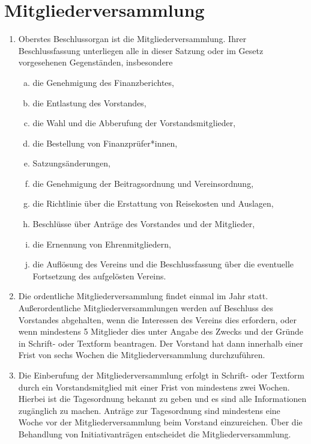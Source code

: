 \documentclass[a4paper]{article}
\begin{document}
\section{Mitgliederversammlung}
\begin{enumerate}
	\item Oberstes Beschlussorgan ist die Mitgliederversammlung. Ihrer Beschlussfassung unterliegen alle in dieser Satzung oder im Gesetz vorgesehenen Gegenständen, insbesondere
	\begin{enumerate}[a)]
		\item die Genehmigung des Finanzberichtes,
		\item die Entlastung des Vorstandes,
		\item die Wahl und die Abberufung der Vorstandsmitglieder,
		\item die Bestellung von Finanzprüfer*innen,
		\item Satzungsänderungen,
		\item die Genehmigung der Beitragsordnung und Vereinsordnung,
		\item die Richtlinie über die Erstattung von Reisekosten und Auslagen,
		\item Beschlüsse über Anträge des Vorstandes und der Mitglieder,
		\item die Ernennung von Ehrenmitgliedern,
		\item die Auflösung des Vereins und die Beschlussfassung über die eventuelle Fortsetzung des aufgelösten Vereins.
	\end{enumerate}
	\item Die ordentliche Mitgliederversammlung findet einmal im Jahr statt. Außerordentliche Mitgliederversammlungen werden auf Beschluss des Vorstandes abgehalten, wenn die Interessen des Vereins dies erfordern, oder wenn mindestens 5 Mitglieder dies unter Angabe des Zwecks und der Gründe in Schrift- oder Textform beantragen. Der Vorstand hat dann innerhalb einer Frist von sechs Wochen die Mitgliederversammlung durchzuführen.

	\item Die Einberufung der Mitgliederversammlung erfolgt in Schrift- oder Textform durch ein Vorstandsmitglied mit einer Frist von mindestens zwei Wochen. Hierbei ist die Tagesordnung bekannt zu geben und es sind alle Informationen zugänglich zu machen. Anträge zur Tagesordnung sind mindestens eine Woche vor der Mitgliederversammlung beim Vorstand einzureichen. Über die Behandlung von Initiativanträgen entscheidet die Mitgliederversammlung.


\end{enumerate}
\end{document}
